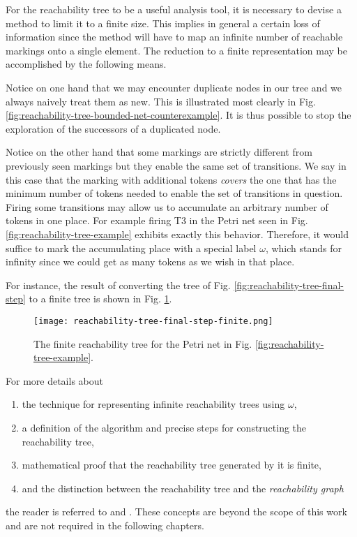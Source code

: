 \documentclass[../Thesis.tex]{subfiles}
\begin{document}
For the reachability tree to be a useful analysis tool,
it is necessary to devise a method to limit it to a finite size.
This implies in general a certain loss of information since the method will have to map
an infinite number of reachable markings onto a single element.
The reduction to a finite representation may be accomplished by the following means.

Notice on one hand that we may encounter duplicate nodes in our tree and we always naively treat them as new.
This is illustrated most clearly in Fig. \ref{fig:reachability-tree-bounded-net-counterexample}.
It is thus possible to stop the exploration of the successors of a duplicated node.

Notice on the other hand that some markings are strictly different from previously seen markings
but they enable the same set of transitions.
We say in this case that the marking with additional tokens \emph{covers} the one
that has the minimum number of tokens needed to enable the set of transitions in question.
Firing some transitions may allow us to accumulate an arbitrary number of tokens in one place.
For example firing T3 in the Petri net seen in Fig. \ref{fig:reachability-tree-example} exhibits exactly this behavior.
Therefore, it would suffice to mark the accumulating place with a special label $\omega$, which stands for infinity
since we could get as many tokens as we wish in that place.

For instance, the result of converting the tree of Fig. \ref{fig:reachability-tree-final-step}
to a finite tree is shown in Fig. \ref{fig:reachability-tree-final-step-finite}.

\begin{figure}[!htb]
    \centering
    \texttt{[image: reachability-tree-final-step-finite.png]}
    \caption{The finite reachability tree for the Petri net in Fig. \ref{fig:reachability-tree-example}.}
    \label{fig:reachability-tree-final-step-finite}
\end{figure}

For more details about

\begin{enumerate}
    \item the technique for representing infinite reachability trees using $\omega$,
    \item a definition of the algorithm and precise steps for constructing the reachability tree,
    \item mathematical proof that the reachability tree generated by it is finite,
    \item and the distinction between the reachability tree and the \emph{reachability graph}
\end{enumerate}

the reader is referred to \cite{murata1989} and \cite{peterson1981}.
These concepts are beyond the scope of this work and are not required in the following chapters.
\end{document}
